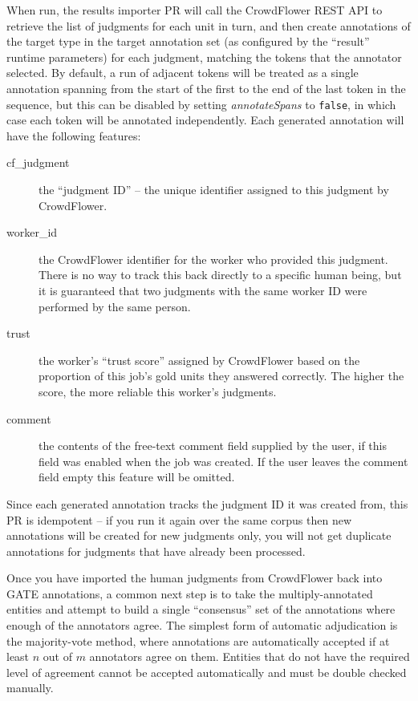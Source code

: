 When run, the results importer PR will call the CrowdFlower REST API to
retrieve the list of judgments for each unit in turn, and then create
annotations of the target type in the target annotation set (as configured by
the ``result'' runtime parameters) for each judgment, matching the tokens that
the annotator selected.  By default, a run of adjacent tokens will be treated
as a single annotation spanning from the start of the first to the end of the
last token in the sequence, but this can be disabled by setting
\emph{annotateSpans} to \verb!false!, in which case each token will be
annotated independently.  Each generated annotation will have the following
features:
\begin{description}
\item[cf\_judgment] the ``judgment ID'' -- the unique identifier assigned to
  this judgment by CrowdFlower.
\item[worker\_id] the CrowdFlower identifier for the worker who provided this
  judgment.  There is no way to track this back directly to a specific human
  being, but it is guaranteed that two judgments with the same worker ID were
  performed by the same person.
\item[trust] the worker's ``trust score'' assigned by CrowdFlower based on the
  proportion of this job's gold units they answered correctly.  The higher the
  score, the more reliable this worker's judgments.
\item[comment] the contents of the free-text comment field supplied by the
  user, if this field was enabled when the job was created.  If the user leaves
  the comment field empty this feature will be omitted.
\end{description}

Since each generated annotation tracks the judgment ID it was created from,
this PR is idempotent -- if you run it again over the same corpus then new
annotations will be created for new judgments only, you will not get duplicate
annotations for judgments that have already been processed.


Once you have imported the human judgments from CrowdFlower back into GATE
annotations, a common next step is to take the multiply-annotated entities and
attempt to build a single ``consensus'' set of the annotations where enough
of the annotators agree.  The simplest form of automatic adjudication is the
majority-vote method, where annotations are automatically accepted if at
least $n$ out of $m$ annotators agree on them.  Entities that do not have the
required level of agreement cannot be accepted automatically and must be double
checked manually.

